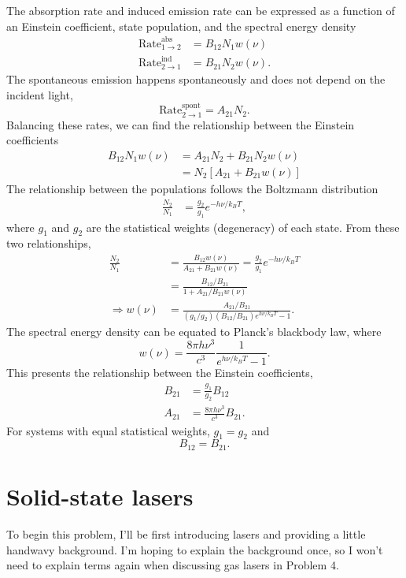 \documentclass{homework}
\begin{document}
	The absorption rate and induced emission rate can be expressed as a function of an Einstein coefficient, state population, and the spectral energy density \begin{align*}
		\mathrm{Rate}_{1 \to 2}^\mathrm{abs} & = B_{12} N_1 w(\nu) \\
		\mathrm{Rate}_{2 \to 1}^\mathrm{ind} & = B_{21} N_2 w(\nu).
	\end{align*}
	The spontaneous emission happens spontaneously and does not depend on the incident light, 
	$$\mathrm{Rate}_{2 \to 1}^\mathrm{spont} = A_{21} N_2.$$
	Balancing these rates, we can find the relationship between the Einstein coefficients \begin{align*}
		B_{12} N_1 w(\nu) & = A_{21} N_2 + B_{21} N_2 w(\nu)  \\
			& = N_2 \left[ A_{21} + B_{21} w(\nu) \right]
	\end{align*}
	The relationship between the populations follows the Boltzmann distribution \begin{align*}
		\frac{N_2}{N_1} & = \frac{g_2}{g_1} e^{-h \nu / k_B T},
	\end{align*}
	where $g_1$ and $g_2$ are the statistical weights (degeneracy) of each state. From these two relationships, 
	\begin{align*}
		\frac{N_2}{N_1} & = \frac{B_{12} w(\nu)}{A_{21} + B_{21} w(\nu)} = \frac{g_2}{g_1} e^{-h \nu / k_B T} \\
			& = \frac{B_{12} / B_{21}}{1 + A_{21} / B_{21} w(\nu)} \\
		\Rightarrow w(\nu) & = \frac{A_{21} / B_{21}}{(g_1 / g_2) (B_{12} / B_{21}) e^{h \nu / k_B T} - 1}.
	\end{align*}
	The spectral energy density can be equated to Planck's blackbody law, where 
		$$w(\nu) = \frac{8 \pi h \nu^3}{c^3} \frac{1}{e^{h \nu / k_B T} - 1}.$$
	This presents the relationship between the Einstein coefficients, \begin{align*}
		B_{21} & = \frac{g_1}{g_2} B_{12} \\
		A_{21} & = \frac{8 \pi h \nu^3}{c^3} B_{21}.
	\end{align*}
	For systems with equal statistical weights, $g_1 = g_2$ and $$B_{12} = B_{21}.$$
	
	\pagebreak
	
	\section{Solid-state lasers}
	To begin this problem, I'll be first introducing lasers and providing a little handwavy background. I'm hoping to explain the background once, so I won't need to explain terms again when discussing gas lasers in Problem 4.
	
\end{document}
